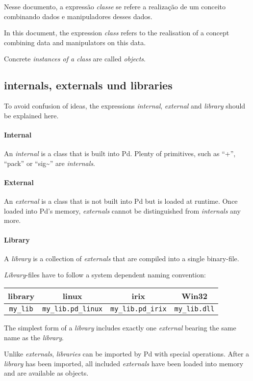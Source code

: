 \documentclass[12pt, a4paper,english,titlepage]{article}
\begin{document}
Nesse documento, a expressão {\em classe} se refere a realização de um
conceito combinando dados e manipuladores desses dados.

In this document, the expression {\em class} refers to the realisation of a concept
combining data and manipulators on this data.

Concrete {\em instances of a class} are called {\em objects}.

\subsection{internals, externals und libraries}

To avoid confusion of ideas, the expressions {\em internal}, {\em external} and
{\em library} should be explained here.

\paragraph{Internal}
An {\em internal} is a class that is built into Pd.
Plenty of primitives, such as ``+'', ``pack'' or ``sig\~\/'' are {\em internals}.

\paragraph{External}
An {\em external} is a class that is not built into Pd but is loaded at runtime.
Once loaded into Pd's memory, {\em externals} cannot be distinguished from
{\em internals} any more.

\paragraph{Library}
A {\em library} is a collection of {\em externals} that are compiled into a 
single binary-file.

{\em Library}-files have to follow a system dependent naming convention:

\begin{tabular}{c||c|c|c}
library & linux&irix&Win32 \\
\hline
{\tt my\_lib}&{\tt  my\_lib.pd\_linux}&{\tt  my\_lib.pd\_irix}&
{\tt  my\_lib.dll}\\
\end{tabular}

The simplest form of a {\em library} includes exactly one {\em external}
bearing the same name as the {\em library}.

Unlike {\em externals}, {\em libraries} can be imported by Pd with special operations.
After a {\em library} has been imported,
all included {\em externals} have been loaded into memory and are available as objects.
\end{document}
